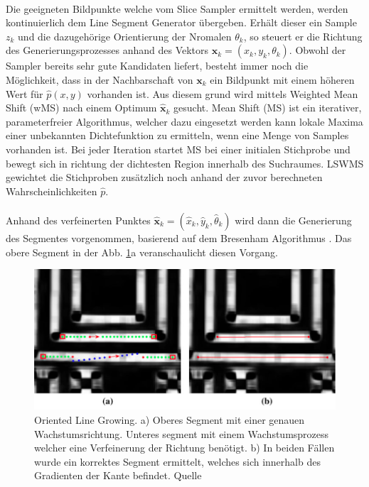 \paragraph{}
Die geeigneten Bildpunkte welche vom Slice Sampler ermittelt werden, werden kontinuierlich dem Line Segment Generator übergeben. Erhält dieser ein Sample $z_k$ und die dazugehörige Orientierung der Nromalen $\theta_k$, so steuert er die Richtung des Generierungsprozesses anhand des Vektors $\textbf{x}_{k} = (x_k, y_k, \theta_k)$. Obwohl der Sampler bereits sehr gute Kandidaten liefert, besteht immer noch die Möglichkeit, dass in der Nachbarschaft von $\textbf{x}_k$ ein Bildpunkt mit einem höheren Wert für $\hat{p}(x, y)$ vorhanden ist. Aus diesem grund wird mittels Weighted Mean Shift (wMS) nach einem Optimum $\hat{\textbf{x}}_k$ gesucht. Mean Shift (MS) ist ein iterativer, parameterfreier Algorithmus, welcher dazu eingesetzt werden kann lokale Maxima einer unbekannten Dichtefunktion zu ermitteln, wenn eine Menge von Samples vorhanden ist. Bei jeder Iteration startet MS bei einer initialen Stichprobe und bewegt sich in richtung der dichtesten Region innerhalb des Suchraumes. LSWMS gewichtet die Stichproben zusätzlich noch anhand der zuvor berechneten Wahrscheinlichkeiten $\hat{p}$.
\paragraph{}
Anhand des verfeinerten Punktes $\hat{\textbf{x}}_k = (\hat{x}_k, \hat{y}_k, \hat{\theta}_k)$ wird dann die Generierung des Segmentes vorgenommen, basierend auf dem Bresenham Algorithmus \cite{bresenham}. Das obere Segment in der Abb. \ref{fig:lswms-line-growing}a veranschaulicht diesen Vorgang.

\begin{figure}[!ht]
\centering
\includegraphics[width=\textwidth]{images/lswms-line-growing} 
\caption{Oriented Line Growing. a) Oberes Segment mit einer genauen Wachstumsrichtung. Unteres segment mit einem Wachstumsprozess welcher eine Verfeinerung der Richtung benötigt. b) In beiden Fällen wurde ein korrektes Segment ermittelt, welches sich innerhalb des Gradienten der Kante befindet. Quelle \cite{nieto}}
\label{fig:lswms-line-growing}
\end{figure}

